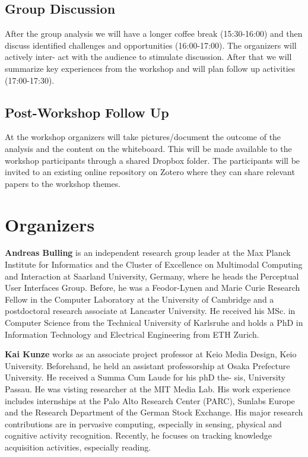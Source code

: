 \documentclass{sigchi-ext}
\begin{document}
\subsection{Group Discussion}
After the group analysis we will have a longer coffee break (15:30-16:00) and then discuss identified challenges and opportunities (16:00-17:00). The organizers will actively inter- act with the audience to stimulate discussion. After that we will summarize key experiences from the workshop and will plan follow up activities (17:00-17:30).

\subsection{Post-Workshop Follow Up}
At the workshop organizers will take pictures/document the outcome of the analysis and the content on the whiteboard. This will be made available to the workshop participants through a shared Dropbox folder. The participants will be invited to an existing online repository on Zotero where they can share relevant papers to the workshop themes.

\section{Organizers}

{\bf Andreas Bulling} is an independent research group leader at the Max Planck Institute for Informatics and the Cluster of Excellence on Multimodal Computing and Interaction at Saarland University, Germany, where he heads the Perceptual User Interfaces Group. Before, he was a Feodor-Lynen and Marie Curie Research Fellow in the Computer Laboratory at the University of Cambridge and a postdoctoral research associate at Lancaster University. He received his MSc. in Computer Science from the Technical University of Karlsruhe and holds a PhD in Information Technology and Electrical Engineering from ETH Zurich.

{\bf Kai Kunze} works as an associate project professor at Keio Media Design, Keio University. Beforehand, he held an assistant professorship at Osaka Prefecture University. He received a Summa Cum Laude for his phD the- sis, University Passau. He was visting researcher at the MIT Media Lab. His work experience includes internships at the Palo Alto Research Center (PARC), Sunlabs Europe and the Research Department of the German Stock Exchange. His major research contributions are in pervasive computing, especially in sensing, physical and cognitive activity recognition. Recently, he focuses on tracking knowledge acquisition activities, especially reading.
\end{document}
